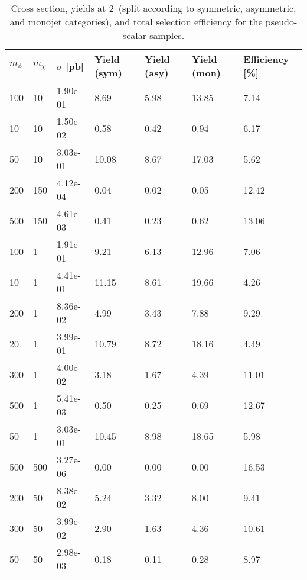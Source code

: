 \begin{table}
\small
\centering
\begin{tabular}{lllllll}
\hline
$m_\phi$ & $m_\chi$ & $\sigma$ [pb] & Yield (sym) & Yield (asy) & Yield (mon) & Efficiency [\%] \\ \hline
100       &   10        &   1.90e-01  &   8.69      &   5.98      &   13.85     &   7.14      \\ 
10        &   10        &   1.50e-02  &   0.58      &   0.42      &   0.94      &   6.17      \\ 
50        &   10        &   3.03e-01  &   10.08     &   8.67      &   17.03     &   5.62      \\ 
200       &   150       &   4.12e-04  &   0.04      &   0.02      &   0.05      &   12.42     \\ 
500       &   150       &   4.61e-03  &   0.41      &   0.23      &   0.62      &   13.06     \\ 
100       &   1         &   1.91e-01  &   9.21      &   6.13      &   12.96     &   7.06      \\ 
10        &   1         &   4.41e-01  &   11.15     &   8.61      &   19.66     &   4.26      \\ 
200       &   1         &   8.36e-02  &   4.99      &   3.43      &   7.88      &   9.29      \\ 
20        &   1         &   3.99e-01  &   10.79     &   8.72      &   18.16     &   4.49      \\ 
300       &   1         &   4.00e-02  &   3.18      &   1.67      &   4.39      &   11.01     \\ 
500       &   1         &   5.41e-03  &   0.50      &   0.25      &   0.69      &   12.67     \\ 
50        &   1         &   3.03e-01  &   10.45     &   8.98      &   18.65     &   5.98      \\ 
500       &   500       &   3.27e-06  &   0.00      &   0.00      &   0.00      &   16.53     \\ 
200       &   50        &   8.38e-02  &   5.24      &   3.32      &   8.00      &   9.41      \\ 
300       &   50        &   3.99e-02  &   2.90      &   1.63      &   4.36      &   10.61     \\ 
50        &   50        &   2.98e-03  &   0.18      &   0.11      &   0.28      &   8.97      \\ 
\hline
\end{tabular}
\caption{Cross section, yields at 2~\ifb (split according to symmetric, asymmetric, and monojet categories), and total selection efficiency for the pseudo-scalar \DMtt samples.}
\label{summaryTableAN_DMttP_xs10_2p1fb_exp}
\end{table}
